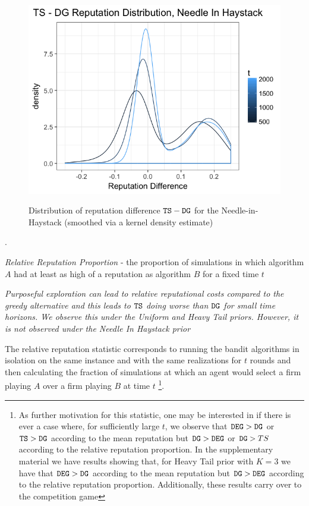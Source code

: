 \documentclass[../competing_bandits.tex]{subfiles}
\begin{document}
{\begin{figure}[H]
\caption{Distribution of reputation difference $\mathtt{TS}-\mathtt{DG}$ for the Needle-in-Haystack (smoothed via a kernel density estimate)}
\includegraphics[scale=0.35]{figures/ts_dg_rep_diff_nih}
\label{ts_dg_rep_diff_nih}
\end{figure}

. 


\begin{definition}
\textit{Relative Reputation Proportion} - the proportion of simulations in which algorithm $A$ had at least as high of a reputation as algorithm $B$ for a fixed time $t$
\end{definition}


\begin{finding}
\textit{Purposeful exploration can lead to relative reputational costs compared to the greedy alternative and this leads to $\mathtt{TS}$ doing worse than $\mathtt{DG}$ for small time horizons. We observe this under the Uniform and Heavy Tail priors. However, it is not observed under the Needle In Haystack prior}
\end{finding}

The relative reputation statistic corresponds to running the bandit algorithms in isolation on the same instance and with the same realizations for $t$ rounds and then calculating the fraction of simulations at which an agent would select a firm playing $A$ over a firm playing $B$ at time $t$ \footnote{As further motivation for this statistic, one may be interested in if there is ever a case where, for sufficiently large $t$, we observe that $\mathtt{DEG} >\mathtt{DG}$ or $\mathtt{TS} > \mathtt{DG}$ according to the mean reputation but $\mathtt{DG} > \mathtt{DEG}$ or $\mathtt{DG} > TS$ according to the relative reputation proportion. In the supplementary material we have results showing that, for Heavy Tail prior with $K=3$ we have that $\mathtt{DEG} > \mathtt{DG}$ according to the mean reputation but $\mathtt{DG} > \mathtt{DEG}$ according to the relative reputation proportion. Additionally, these results carry over to the competition game}.

}
\end{document}
